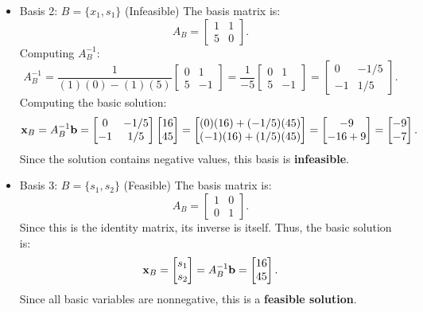 \begin{itemize}
\item  Basis 2: \(B= \{x_1, s_1\} \) (Infeasible)
The basis matrix is:
\[
A_B =
\begin{bmatrix}
    1 & 1 \\
    5 & 0
\end{bmatrix}.
\]
Computing \( A_B^{-1} \):
\[
A_B^{-1} =
\frac{1}{(1)(0) - (1)(5)}
\begin{bmatrix}
    0 & 1 \\
    5 & -1
\end{bmatrix}
=
\frac{1}{-5}
\begin{bmatrix}
    0 & 1 \\
    5 & -1
\end{bmatrix}
=
\begin{bmatrix}
    0 & -1/5 \\
    -1 & 1/5
\end{bmatrix}.
\]
Computing the basic solution:
\[
\mathbf{x}_B = A_B^{-1}\mathbf{b}=
\begin{bmatrix}
    0 & -1/5 \\
    -1 & 1/5
\end{bmatrix}
\begin{bmatrix}
    16 \\ 45
\end{bmatrix}
=
\begin{bmatrix}
    (0)(16) + (-1/5)(45) \\
    (-1)(16) + (1/5)(45)
\end{bmatrix}
=
\begin{bmatrix}
    -9 \\
    -16 + 9
\end{bmatrix}
=
\begin{bmatrix}
    -9 \\ -7
\end{bmatrix}.
\]
Since the solution contains negative values, this basis is \textbf{infeasible}.

\item  Basis 3: \(B= \{s_1, s_2\} \) (Feasible)
The basis matrix is:
\[
A_B =
\begin{bmatrix}
    1 & 0 \\
    0 & 1
\end{bmatrix}.
\]
Since this is the identity matrix, its inverse is itself. Thus, the basic solution is:
\[
\mathbf{x}_B = \begin{bmatrix} s_1 \\ s_2 \end{bmatrix} = A_B^{-1}\mathbf{b}=
\begin{bmatrix}
    16 \\ 45
\end{bmatrix}.
\]
Since all basic variables are nonnegative, this is a \textbf{feasible solution}.
\end{itemize}


